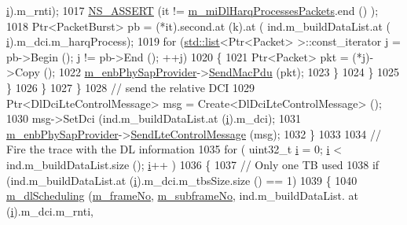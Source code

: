 \begin{DoxyCode}
      \hyperlink{bernuolliDistribution_8m_a6f6ccfcf58b31cb6412107d9d5281426}{i}).m\_rnti);
1017                       \hyperlink{assert_8h_a6dccdb0de9b252f60088ce281c49d052}{NS\_ASSERT} (it != \hyperlink{classns3_1_1LteEnbMac_aaf60e2fb6f8326eeebbdec6b7e7054da}{m\_miDlHarqProcessesPackets}.end ()
      );
1018                       Ptr<PacketBurst> pb = (*it).second.at (k).at ( ind.m\_buildDataList.at (
      \hyperlink{bernuolliDistribution_8m_a6f6ccfcf58b31cb6412107d9d5281426}{i}).m\_dci.m\_harqProcess);
1019                       \textcolor{keywordflow}{for} (\hyperlink{openflow-interface_8h_afd9bcfa176617760671b67580f536fa7}{std::list}<Ptr<Packet> >::const\_iterator j = pb->Begin (); j != pb->End 
      (); ++j)
1020                         \{
1021                           Ptr<Packet> pkt = (*j)->Copy ();
1022                           \hyperlink{classns3_1_1LteEnbMac_a1f4686da5350f6b70b6b966322c109fd}{m\_enbPhySapProvider}->\hyperlink{classns3_1_1LteEnbPhySapProvider_ad9d8ed21001df4df23c132fd90cf402d}{SendMacPdu} (pkt);
1023                         \}
1024                     \}
1025                 \}
1026             \}
1027         \}
1028       \textcolor{comment}{// send the relative DCI}
1029       Ptr<DlDciLteControlMessage> msg = Create<DlDciLteControlMessage> ();
1030       msg->SetDci (ind.m\_buildDataList.at (\hyperlink{bernuolliDistribution_8m_a6f6ccfcf58b31cb6412107d9d5281426}{i}).m\_dci);
1031       \hyperlink{classns3_1_1LteEnbMac_a1f4686da5350f6b70b6b966322c109fd}{m\_enbPhySapProvider}->\hyperlink{classns3_1_1LteEnbPhySapProvider_a091d846bf3255f2ae15a8cea600fba0e}{SendLteControlMessage} (msg);
1032     \}
1033 
1034   \textcolor{comment}{// Fire the trace with the DL information}
1035   \textcolor{keywordflow}{for} (  uint32\_t \hyperlink{bernuolliDistribution_8m_a6f6ccfcf58b31cb6412107d9d5281426}{i}  = 0; \hyperlink{bernuolliDistribution_8m_a6f6ccfcf58b31cb6412107d9d5281426}{i} < ind.m\_buildDataList.size (); \hyperlink{bernuolliDistribution_8m_a6f6ccfcf58b31cb6412107d9d5281426}{i}++ )
1036     \{
1037       \textcolor{comment}{// Only one TB used}
1038       \textcolor{keywordflow}{if} (ind.m\_buildDataList.at (\hyperlink{bernuolliDistribution_8m_a6f6ccfcf58b31cb6412107d9d5281426}{i}).m\_dci.m\_tbsSize.size () == 1)
1039         \{
1040           \hyperlink{classns3_1_1LteEnbMac_a76fc41748a5422281aa4f3d2739512b5}{m\_dlScheduling} (\hyperlink{classns3_1_1LteEnbMac_a1ca20e5d0d321f28dc931bdcccadfada}{m\_frameNo}, \hyperlink{classns3_1_1LteEnbMac_adccfd57ac8aedd1182963517546fde38}{m\_subframeNo}, ind.m\_buildDataList.
      at (\hyperlink{bernuolliDistribution_8m_a6f6ccfcf58b31cb6412107d9d5281426}{i}).m\_dci.m\_rnti,

\end{DoxyCode}
